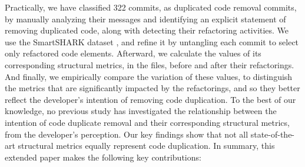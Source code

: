 Practically, we have classified 322 commits, as duplicated code removal commits, by manually analyzing their messages and identifying an explicit statement of removing duplicated code, along with detecting their refactoring activities. We use the SmartSHARK dataset \citep{trautsch2021msr}, and refine it by untangling each commit to select only refactored code elements. Afterward, we calculate the values of its corresponding structural metrics, in the files, before and after their refactorings. And finally, we empirically compare the variation of these values, to distinguish the metrics that are significantly impacted by the refactorings, and so they better reflect the developer's intention of removing code duplication. To the best of our knowledge, no previous study has investigated the relationship between the intention of code duplicate removal and their corresponding structural metrics, from the developer's perception. Our key findings show that not all state-of-the-art structural metrics equally represent code duplication. %
 In summary, this extended paper makes the following key contributions:

